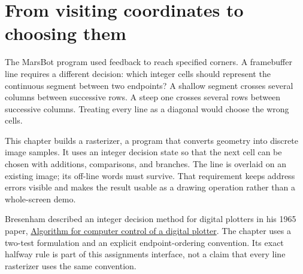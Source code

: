\section{From visiting coordinates to choosing
  them}\label{007-bresenham-line-p00-from-visiting-coordinates-to-choosing-them}

The MarsBot program used feedback to reach specified corners. A
framebuffer line requires a different decision: which integer cells
should represent the continuous segment between two endpoints? A shallow
segment crosses several columns between successive rows. A steep one
crosses several rows between successive columns. Treating every line as
a diagonal would choose the wrong cells.

This chapter builds a rasterizer, a program that converts geometry into
discrete image samples. It uses an integer decision state so that the
next cell can be chosen with additions, comparisons, and branches. The
line is overlaid on an existing image; its off-line words must survive.
That requirement keeps address errors visible and makes the result
usable as a drawing operation rather than a whole-screen demo.

Bresenham described an integer decision method for digital plotters in
his 1965 paper,
\href{https://janmr.com/files/papers/bresenham65.pdf}{Algorithm for
  computer control of a digital plotter}. The chapter uses a two-test
formulation and an explicit endpoint-ordering convention. Its exact
halfway rule is part of this assignment\textquotesingle s interface, not
a claim that every line rasterizer uses the same convention.
